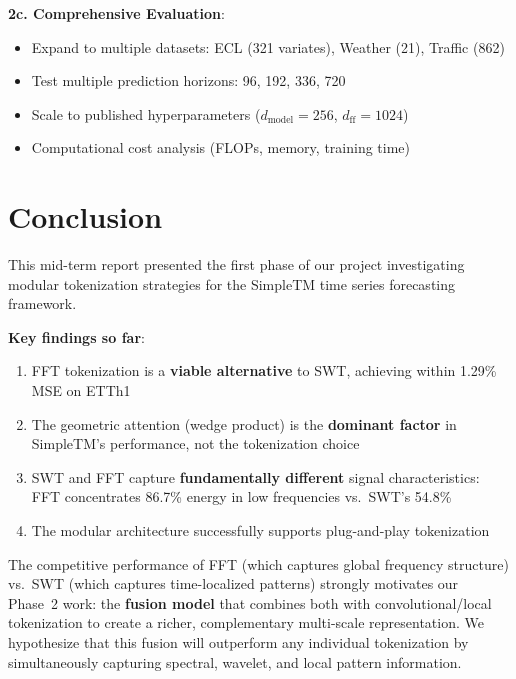 \documentclass[12pt,a4paper]{article}
\begin{document}
\textbf{2c. Comprehensive Evaluation}:
\begin{itemize}[noitemsep]
  \item Expand to multiple datasets: ECL (321 variates), Weather (21), Traffic (862)
  \item Test multiple prediction horizons: 96, 192, 336, 720
  \item Scale to published hyperparameters ($d_\text{model}=256$, $d_\text{ff}=1024$)
  \item Computational cost analysis (FLOPs, memory, training time)
\end{itemize}

\section{Conclusion}

This mid-term report presented the first phase of our project investigating modular tokenization strategies for the SimpleTM time series forecasting framework. 

\textbf{Key findings so far}:
\begin{enumerate}[noitemsep]
  \item FFT tokenization is a \textbf{viable alternative} to SWT, achieving within 1.29\% MSE on ETTh1
  \item The geometric attention (wedge product) is the \textbf{dominant factor} in SimpleTM's performance, not the tokenization choice
  \item SWT and FFT capture \textbf{fundamentally different} signal characteristics: FFT concentrates 86.7\% energy in low frequencies vs.\ SWT's 54.8\%
  \item The modular architecture successfully supports plug-and-play tokenization
\end{enumerate}

The competitive performance of FFT (which captures global frequency structure) vs.\ SWT (which captures time-localized patterns) strongly motivates our Phase~2 work: the \textbf{fusion model} that combines both with convolutional/local tokenization to create a richer, complementary multi-scale representation. We hypothesize that this fusion will outperform any individual tokenization by simultaneously capturing spectral, wavelet, and local pattern information.
\end{document}
